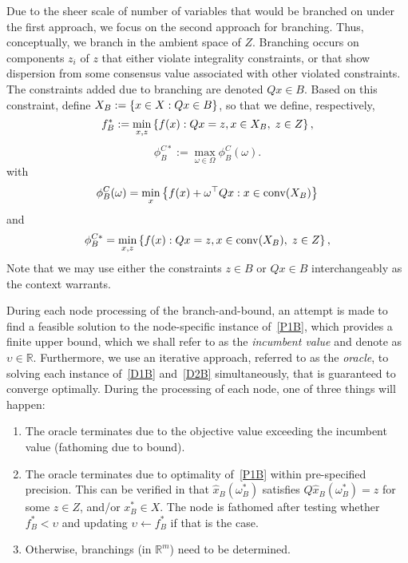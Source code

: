Due to the sheer scale of number of variables that would be branched on under the first approach, we focus on the second approach for branching. Thus, conceptually, we branch in the ambient space of $Z$.
Branching occurs on components $z_i$ of $z$ that either violate integrality constraints, or that show dispersion from some consensus value associated with other violated constraints.
The constraints added due to branching are denoted $Qx \in B$. Based on this constraint, define $X_B:=\left\{ x \in X : Qx \in B \right \}$, so that we define, respectively,
\begin{equation}\label{P1B}
f_B^*:=\min_{x,z} \left\{ f(x) : Qx=z, x \in X_B,\; z \in Z \right \},
\end{equation}
\begin{equation}\label{D1B}
\phi_{B}^{C*}:=\max_{\omega \in \Omega} \phi_B^C(\omega).
\end{equation}
with
\begin{equation}\label{PhiCB}
\phi_B^C(\omega) = \min_x \left\{ f(x) + \omega^\top Qx : x \in \operatorname{conv}(X_B) \right \}
\end{equation} 
and
\begin{equation}\label{D2B}
\phi_{B}^{C*}=\min_{x,z} \left\{ f(x) : Qx=z, x \in \operatorname{conv}(X_B),\; z \in Z \right \},
\end{equation}
Note that we may use either the constraints $z \in B$ or $Qx \in B$ interchangeably as the context warrants.




During each node processing of the branch-and-bound, an attempt is made to find a feasible solution to the node-specific instance of~\eqref{P1B}, which provides a finite upper bound, which we shall refer to as the \emph{incumbent value} and denote as $\upsilon \in \mathbb{R}$. Furthermore, we use an iterative approach, referred to as the \emph{oracle}, to solving each instance of~\eqref{D1B} and~\eqref{D2B} simultaneously, that is guaranteed to converge optimally. During the processing of each node, one of three things will happen:
\begin{enumerate}
\item The oracle terminates due to the objective value exceeding the incumbent value (fathoming due to bound).
\item The oracle terminates due to optimality of~\eqref{P1B} within pre-specified precision. This can be verified in that $\widehat{x}_B(\omega_B^*)$ satisfies $Q\widehat{x}_B(\omega_B^*) = z$ for some $z \in Z$, and/or $x_B^* \in X$. The node is fathomed after testing whether $f_B^* < \upsilon$
and updating $\upsilon \gets f_B^*$ if that is the case.
\item Otherwise, branchings (in $\mathbb{R}^m$) need to be determined.
\end{enumerate}

